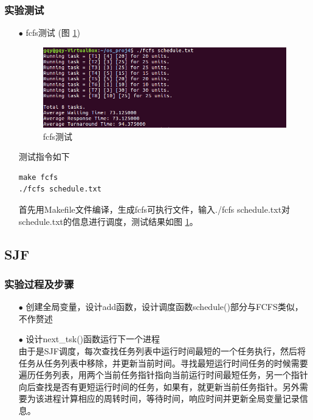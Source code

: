 \documentclass{article}
\begin{document}
\subsubsection{实验测试}
\begin{itemize}
\item[$\bullet$]fcfs测试 (图 \ref{fcfs测试})
\begin{figure}[htbp]
		\centering
		\includegraphics{fcfs}
		\caption{fcfs测试} \label{fcfs测试}
\end{figure}

测试指令如下
\begin{lstlisting}[language={[ANSI]C}]
make fcfs
./fcfs schedule.txt
\end{lstlisting}
首先用Makefile文件编译，生成fcfs可执行文件，输入./fcfs schedule.txt对schedule.txt的信息进行调度，测试结果如图 \ref{fcfs测试}。
\end{itemize}
\subsection{SJF}
\subsubsection{实验过程及步骤}
\begin{itemize}
\item[$\bullet$]创建全局变量，设计add函数，设计调度函数schedule()部分与FCFS类似，不作赘述
\item[$\bullet$]设计next\_tsk()函数运行下一个进程\\
由于是SJF调度，每次查找任务列表中运行时间最短的一个任务执行，然后将任务从任务列表中移除，并更新当前时间。寻找最短运行时间任务的时候需要遍历任务列表，用两个当前任务指针指向当前运行时间最短任务，另一个指针向后查找是否有更短运行时间的任务，如果有，就更新当前任务指针。另外需要为该进程计算相应的周转时间，等待时间，响应时间并更新全局变量记录信息。
\end{itemize}
\end{document}
